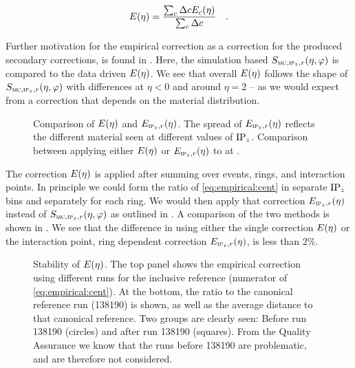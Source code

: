 \begin{equation}
  \label{eq:empirical}
  \EmpCor{} = \frac{\sum_c \Delta c\EmpCor[c]{}}{\sum_c \Delta c}\quad.
\end{equation}

Further motivation for the empirical correction as a correction for
the produced secondary corrections, is found in
.  Here, the simulation based $\SecMap$
is compared to the data driven $\EmpCor$.  We see that overall
$\EmpCor$ follows the shape of $\SecMap$ with differences at $\eta<0$
and around $\eta=2$ -- as we would expect from a correction that
depends on the material distribution.

\begin{figure}[h!tbp]
  \centering
  \caption{ Comparison of $\EmpCor$
    and $\EmpCor[\subIPz,r]{}$.  The spread of $\EmpCor[\subIPz,r]{}$
    reflects the different material seen at different values of
    $\IPz$.   Comparison between
    applying either $\EmpCor$ or $\EmpCor[\subIPz,r]{}$ to \ppCol{} at
    . }
  \label{fig:empirical:methods}
\end{figure}

The correction $\EmpCor$ is applied after summing over events, rings,
and interaction points.  In principle we could form the ratio of
\eqref{eq:empirical:cent} in separate $\IPz$ bins and separately for
each \FMD{} ring.  We would then apply that correction
$\EmpCor[\subIPz,r]{}$ instead of $\SecMap$ as outlined in
.  A comparison of the two methods is shown
in .  We see that the difference in
using either the single correction $\EmpCor$ or the interaction point,
ring dependent correction $\EmpCor[\subIPz,r]{}$, is less than 2\%.

\begin{figure}[h!tbp]
  \centering
  \caption{Stability of $\EmpCor$. The top panel shows the empirical
    correction using different runs for the inclusive reference
    (numerator of \eqref{eq:empirical:cent}).  At the bottom, the
    ratio to the canonical reference run (138190) is shown, as well as
    the average distance to that canonical reference. Two groups are
    clearly seen: Before run 138190 (circles) and after run 138190
    (squares).  From the Quality Assurance we know that the runs
    before 138190 are problematic, and are therefore not considered. }
  \label{fig:empirical:empcor_stable}
\end{figure}

